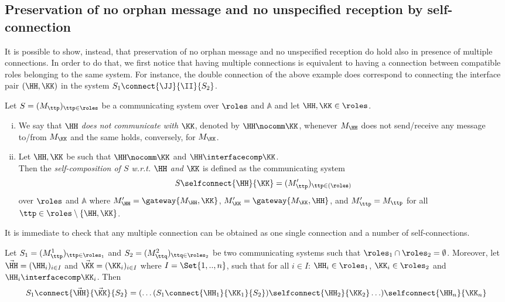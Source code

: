  \subsection{Preservation of no orphan message and no unspecified reception by self-connection}

 It is possible to show, instead, that preservation of no orphan message and no unspecified reception
 do hold also in presence of multiple connections. 
 In order to do that, we first  notice that having multiple connections is equivalent to having a connection between compatible roles belonging to the
 same system. For instance, the double connection of the above example does correspond to connecting the interface pair $(\HH, \KK)$ in the system ${S_{1}}\connect{\JJ}{\II} {S_{2}}$. 
 
 \begin{definition}
 \label{def.selfconn}
 Let $S = (M_\ttp)_{\ttp\in\roles}$  be a communicating system
over $\roles$ and $\mathbb{A}$ and let $\HH,\KK\in\roles$.
\begin{enumerate}[i)]
\item
We say that {\em $\HH$ does not communicate with $\KK$}, denoted by $\HH\nocomm\KK$,
whenever $M_\HH$ does not send/receive any message to/from $M_\KK$ and the same holds, conversely, for $M_\KK$.
\item
Let $\HH,\KK$ be such that  $\HH\nocomm\KK$ and 
 $\HH\interfacecomp \KK$.\\ 
Then the \emph{self-composition of $S$  w.r.t. ${\HH}$ and ${\KK}$} is defined as the communicating system
                        $$S\selfconnect{\HH}{\KK} = (M'_\ttp)_{\ttp\in(\roles)}$$
over $\roles$ and $\mathbb{A}$
where $M'_\HH = \gateway{M_{\HH}, \KK}$, $M'_\KK = \gateway{M_{\KK}, \HH}$, and
$M'_\ttp =M_\ttp$ for all $\ttp\in\roles \setminus\{\HH,\KK\}$.
\end{enumerate}
\end{definition}
 
 
 
 It is immediate to check that any multiple connection can be obtained as one single connection and a number
 of self-connections.
 
 \begin{fact}
 \label{fact:selfmulti}
 Let $S_1 = (M^1_\ttp)_{\ttp\in\roles_1}$ and $S_2 = (M^2_\ttq)_{\ttq\in\roles_2}$ be two communicating systems
such that $\roles_1\cap\roles_2 = \emptyset$.
 Moreover, let $\vec{\HH}=(\HH_i)_{i\in I}$ and  $\vec{\KK}=(\KK_i)_{i\in I}$ where $I=\Set{1,..,n}$,
such that for all $i\in I$: $\HH_i\in\roles_1$, $\KK_i\in\roles_2$  and
 $\HH_i \interfacecomp \KK_i$. Then\\
$${S_1}\connect{\vec{\HH}}{\vec{\KK}} {S_2} 
     = (\ldots({S_1}\connect{{\HH_1}}{{\KK_1}} {S_2})\selfconnect{\HH_2}{\KK_2}\ldots)\selfconnect{\HH_n}{\KK_n}$$
 \end{fact}
 
